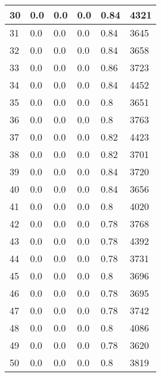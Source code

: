 \begin{longtable}{|l|l|l|l|l|l|}
30 & 0.0 & 0.0 & 0.0 & 0.84 & 4321 \\ \hline 
31 & 0.0 & 0.0 & 0.0 & 0.84 & 3645 \\ \hline 
32 & 0.0 & 0.0 & 0.0 & 0.84 & 3658 \\ \hline 
33 & 0.0 & 0.0 & 0.0 & 0.86 & 3723 \\ \hline 
34 & 0.0 & 0.0 & 0.0 & 0.84 & 4452 \\ \hline 
35 & 0.0 & 0.0 & 0.0 & 0.8 & 3651 \\ \hline 
36 & 0.0 & 0.0 & 0.0 & 0.8 & 3763 \\ \hline 
37 & 0.0 & 0.0 & 0.0 & 0.82 & 4423 \\ \hline 
38 & 0.0 & 0.0 & 0.0 & 0.82 & 3701 \\ \hline 
39 & 0.0 & 0.0 & 0.0 & 0.84 & 3720 \\ \hline 
40 & 0.0 & 0.0 & 0.0 & 0.84 & 3656 \\ \hline 
41 & 0.0 & 0.0 & 0.0 & 0.8 & 4020 \\ \hline 
42 & 0.0 & 0.0 & 0.0 & 0.78 & 3768 \\ \hline 
43 & 0.0 & 0.0 & 0.0 & 0.78 & 4392 \\ \hline 
44 & 0.0 & 0.0 & 0.0 & 0.78 & 3731 \\ \hline 
45 & 0.0 & 0.0 & 0.0 & 0.8 & 3696 \\ \hline 
46 & 0.0 & 0.0 & 0.0 & 0.78 & 3695 \\ \hline 
47 & 0.0 & 0.0 & 0.0 & 0.78 & 3742 \\ \hline 
48 & 0.0 & 0.0 & 0.0 & 0.8 & 4086 \\ \hline 
49 & 0.0 & 0.0 & 0.0 & 0.78 & 3620 \\ \hline 
50 & 0.0 & 0.0 & 0.0 & 0.8 & 3819 \\ \hline 
\end{longtable}